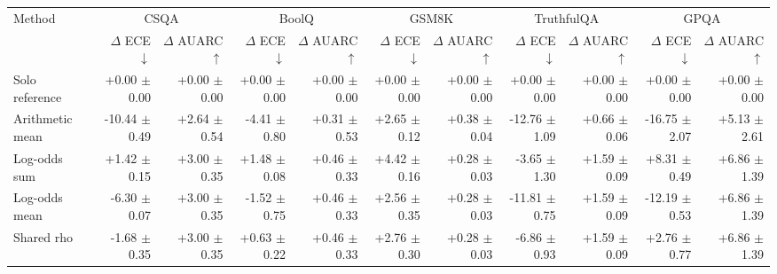 \begin{tabular}{lrrrrrrrrrr}
\toprule
Method & \multicolumn{2}{c}{CSQA} & \multicolumn{2}{c}{BoolQ} & \multicolumn{2}{c}{GSM8K} & \multicolumn{2}{c}{TruthfulQA} & \multicolumn{2}{c}{GPQA} \\
 & $\Delta$ ECE $\downarrow$ & $\Delta$ AUARC $\uparrow$ & $\Delta$ ECE $\downarrow$ & $\Delta$ AUARC $\uparrow$ & $\Delta$ ECE $\downarrow$ & $\Delta$ AUARC $\uparrow$ & $\Delta$ ECE $\downarrow$ & $\Delta$ AUARC $\uparrow$ & $\Delta$ ECE $\downarrow$ & $\Delta$ AUARC $\uparrow$ \\
\midrule
Solo reference & +0.00 {\scriptsize $\pm$ 0.00} & +0.00 {\scriptsize $\pm$ 0.00} & +0.00 {\scriptsize $\pm$ 0.00} & +0.00 {\scriptsize $\pm$ 0.00} & +0.00 {\scriptsize $\pm$ 0.00} & +0.00 {\scriptsize $\pm$ 0.00} & +0.00 {\scriptsize $\pm$ 0.00} & +0.00 {\scriptsize $\pm$ 0.00} & +0.00 {\scriptsize $\pm$ 0.00} & +0.00 {\scriptsize $\pm$ 0.00} \\
Arithmetic mean & -10.44 {\scriptsize $\pm$ 0.49} & +2.64 {\scriptsize $\pm$ 0.54} & -4.41 {\scriptsize $\pm$ 0.80} & +0.31 {\scriptsize $\pm$ 0.53} & +2.65 {\scriptsize $\pm$ 0.12} & +0.38 {\scriptsize $\pm$ 0.04} & -12.76 {\scriptsize $\pm$ 1.09} & +0.66 {\scriptsize $\pm$ 0.06} & -16.75 {\scriptsize $\pm$ 2.07} & +5.13 {\scriptsize $\pm$ 2.61} \\
Log-odds sum & +1.42 {\scriptsize $\pm$ 0.15} & +3.00 {\scriptsize $\pm$ 0.35} & +1.48 {\scriptsize $\pm$ 0.08} & +0.46 {\scriptsize $\pm$ 0.33} & +4.42 {\scriptsize $\pm$ 0.16} & +0.28 {\scriptsize $\pm$ 0.03} & -3.65 {\scriptsize $\pm$ 1.30} & +1.59 {\scriptsize $\pm$ 0.09} & +8.31 {\scriptsize $\pm$ 0.49} & +6.86 {\scriptsize $\pm$ 1.39} \\
Log-odds mean & -6.30 {\scriptsize $\pm$ 0.07} & +3.00 {\scriptsize $\pm$ 0.35} & -1.52 {\scriptsize $\pm$ 0.75} & +0.46 {\scriptsize $\pm$ 0.33} & +2.56 {\scriptsize $\pm$ 0.35} & +0.28 {\scriptsize $\pm$ 0.03} & -11.81 {\scriptsize $\pm$ 0.75} & +1.59 {\scriptsize $\pm$ 0.09} & -12.19 {\scriptsize $\pm$ 0.53} & +6.86 {\scriptsize $\pm$ 1.39} \\
Shared rho & -1.68 {\scriptsize $\pm$ 0.35} & +3.00 {\scriptsize $\pm$ 0.35} & +0.63 {\scriptsize $\pm$ 0.22} & +0.46 {\scriptsize $\pm$ 0.33} & +2.76 {\scriptsize $\pm$ 0.30} & +0.28 {\scriptsize $\pm$ 0.03} & -6.86 {\scriptsize $\pm$ 0.93} & +1.59 {\scriptsize $\pm$ 0.09} & +2.76 {\scriptsize $\pm$ 0.77} & +6.86 {\scriptsize $\pm$ 1.39} \\

\end{tabular}
